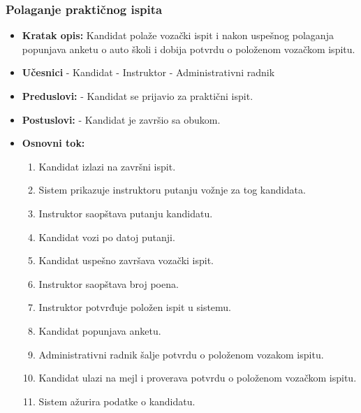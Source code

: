 \subsubsection{Polaganje praktičnog ispita}

\vspace{3mm}

\begin{itemize}

\item \textbf{Kratak opis:} Kandidat polaže vozački ispit i nakon uspešnog polaganja popunjava anketu o auto školi i dobija potvrdu o položenom vozačkom ispitu.

\vspace{2mm}

\item \textbf{Učesnici} \newline
   - Kandidat \newline   
   - Instruktor \newline
   - Administrativni radnik 
   
\item \textbf{Preduslovi:} \newline
   - Kandidat se prijavio za praktični ispit.

\item \textbf{Postuslovi:} \newline
    - Kandidat je završio sa obukom.

\item \textbf{Osnovni tok:}  
   \begin{enumerate}
   \item Kandidat izlazi na završni ispit.
   \item Sistem prikazuje instruktoru putanju vožnje za tog kandidata.
   \item Instruktor saopštava putanju kandidatu.
   \item Kandidat vozi po datoj putanji.
   \item Kandidat uspešno završava vozački ispit.
   \item Instruktor saopštava broj poena.
   \item Instruktor potvrđuje položen ispit u sistemu.
   \item Kandidat popunjava anketu.
   \item Administrativni radnik šalje potvrdu o položenom vozakom ispitu.
   \item Kandidat ulazi na mejl i proverava potvrdu o položenom vozačkom ispitu.
   \item Sistem ažurira podatke o kandidatu.     


\end{enumerate}
\end{itemize}
